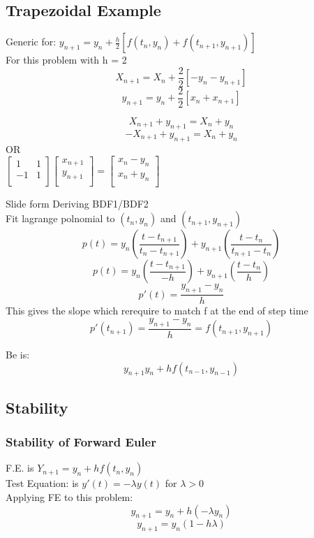 \documentclass[12pt]{article}
\begin{document}
	\subsection*{Trapezoidal Example}
	Generic for: $y_{n+1} = y_n + \frac{h}{2}[f(t_n,y_n) + f(t_{n+1}, y_{n+1})]$\\
	For this problem with h = 2\\
	$$X_{n+1} = X_n + \frac{2}{2}[-y_n - y_{n+1}]$$
	$$y_{n+1} = y_n + \frac{2}{2}[x_n + x_{n+1}]$$
	
	$$X_{n+1} + y_{n+1} = X_n + y_n$$
	$$-X_{n+1} + y_{n+1} = X_n + y_n$$
	OR\\
	$
	\begin{bmatrix}
	1 & 1 \\
	-1 & 1 \\
	\end{bmatrix}
	\begin{bmatrix}
	x_{n+1} \\
	y_{n+1} \\
	\end{bmatrix}
	=
	\begin{bmatrix}
	x_n - y_n \\
	x_n + y_n \\
	\end{bmatrix}
	$
	
	Slide form Deriving BDF1/BDF2\\
	
	Fit lagrange polnomial to $(t_n, y_n)$ and $(t_{n+1}, y_{n+1})$\\
	$$p(t) = y_n(\frac{t - t_{n+1}}{t_n - t_{n+1}}) + y_{n+1}(\frac{t-t_n}{t_{n+1}-t_n})$$
	$$p(t) = y_n(\frac{t-t_{n+1}}{-h}) + y_{n+1}(\frac{t-t_n}{h})$$
	$$p'(t) = \frac{y_{n+1} - y_n}{h}$$
	This gives the slope which rerequire to match f at the end of step time\\
	$$p'(t_{n+1}) = \frac{y_{n+1}-y_n}{h} = f(t_{n+1}, y_{n+1})$$
	
	Be is:\\
	$$y_{n+1} y_n + hf(t_{n-1}, y_{n-1})$$
	\subsection*{Stability}
	\subsubsection*{Stability of Forward Euler}
	F.E. is $Y_{n+1} = y_n + hf(t_n,y_n)$\\
	Test Equation: is $y'(t) = -\lambda y(t)$ for $\lambda > 0$\\
	Applying FE to this problem:\\
	$$y_{n+1} = y_n + h(-\lambda y_n)$$
	$$y_{n+1} = y_n(1-h\lambda)$$
	
\end{document}
